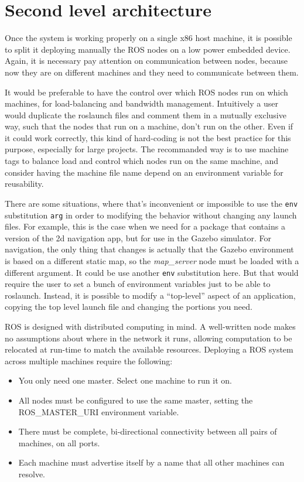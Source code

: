 \section{Second level architecture}
Once the system is working properly on a single x86 host machine, it is possible to split it deploying manually the ROS nodes on a low power embedded device.
Again, it is necessary pay attention on communication between nodes, because now they are on different machines and they need to communicate between them.

It would be preferable to have the control over which ROS nodes run on which machines, for load-balancing and bandwidth management.
Intuitively a user would duplicate the roslaunch files and comment them in a mutually exclusive way, such that the nodes that run on a machine, don't run on the other. Even if it could work correctly, this kind of hard-coding is not the best practice for this purpose, especially for large projects. The recommanded way is to use machine tags to balance load and control which nodes run on the same machine, and consider having the machine file name depend on an environment variable for reusability.

There are some situations, where that's inconvenient or impossible to use the \texttt{env} substitution \texttt{arg} in order to modifying the behavior without changing any launch files. For example, this is the case when we need for a package that contains a version of the 2d navigation app, but for use in the Gazebo simulator.
For navigation, the only thing that changes is actually that the Gazebo environment is based on a different static map, so the \textit{map\_server} node must be loaded with a different argument. It could be use another \texttt{env} substitution here. But that would require the user to set a bunch of environment variables just to be able to roslaunch. 
Instead, it is possible to modify a ``top-level'' aspect of an application, copying the top level launch file and changing the portions you need. 


ROS is designed with distributed computing in mind. A well-written node makes no assumptions about where in the network it runs, allowing computation to be relocated at run-time to match the available resources. Deploying a ROS system across multiple machines require the following:

\begin{itemize}
	\item You only need one master. Select one machine to run it on.
	\item All nodes must be configured to use the same master, setting the ROS\_MASTER\_URI environment variable.
	\item There must be complete, bi-directional connectivity between all pairs of machines, on all ports.
	\item Each machine must advertise itself by a name that all other machines can resolve.
\end{itemize}  

